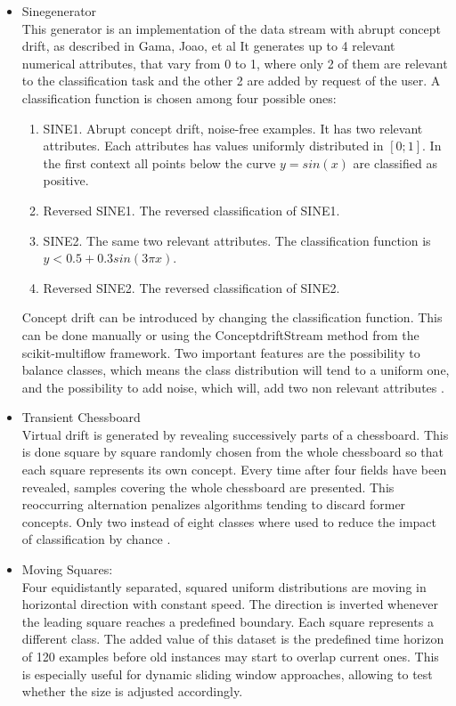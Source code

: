 \documentclass[12pt,oneside,a4paper,parskip]{scrbook}
\begin{document}
\begin{itemize}
  \item Sinegenerator\\
        This generator is an implementation of the data stream with abrupt concept drift, as described in Gama, Joao, et al \cite{sinegenerator}
        It generates up to 4 relevant numerical attributes, that vary from 0 to 1, where only 2 of them are relevant to 
        the classification task and the other 2 are added by request of the user. A classification function is chosen 
        among four possible ones: 
        \begin{enumerate}
          \item SINE1. Abrupt concept drift, noise-free examples. It has two relevant attributes. Each attributes has 
          values uniformly distributed in $[0;1]$. In the first context all points below the curve $y=sin(x)$ are classified as positive.
          \item Reversed SINE1. The reversed classification of SINE1.
          \item SINE2. The same two relevant attributes. The classification function is $y<0.5+0.3sin(3\pi x)$.
          \item Reversed SINE2. The reversed classification of SINE2.
        \end{enumerate}

        Concept drift can be introduced by changing the classification function. This can be done manually or using the ConceptdriftStream method
        from the scikit-multiflow framework.
        Two important features are the possibility to balance classes, which means the class distribution will tend to a uniform one, and the 
        possibility to add noise, which will, add two non relevant attributes \cite{skmultiflow}.
    
  \item Transient Chessboard\\
        Virtual drift is generated by revealing successively parts of a chessboard. This is done square by square 
        randomly chosen from the whole chessboard so that each square represents its own concept. Every time after four 
        fields have been revealed, samples covering the whole chessboard are presented. This reoccurring alternation 
        penalizes algorithms tending to discard former concepts. Only two instead of eight classes where used to reduce
        the impact of classification by chance \cite{movingsquaresChessboardRialtobridge}.


  \item Moving Squares: \\
        Four equidistantly separated, squared uniform distributions are moving in horizontal direction with constant 
        speed. The direction is inverted whenever the leading square reaches a predefined boundary. Each square 
        represents a different class. The added value of this dataset is the predefined time horizon of 120 examples 
        before old instances may start to overlap current ones. This is especially useful for dynamic sliding window 
        approaches, allowing to test whether the size is adjusted accordingly. \cite{movingsquaresChessboardRialtobridge}
        


\end{itemize}
\end{document}
